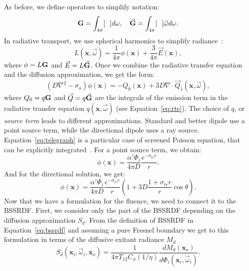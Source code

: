 As before, we define operators to simplify notation:
\begin{equation*}
\operator{G} = \int_{4\pi} [\ \ ] d\omega, \ \ \ \vec{\operator{G}} = \int_{4\pi} [\ \ ] \vec{\omega} d\omega.
\end{equation*}
In radiative transport, we use spherical harmonics to simplify radiance~\cite{Eason1978}:
\begin{equation*}
L(\mathbf{x}, \vec{\omega}) = \frac{1}{4\pi}\phi(\mathbf{x}) + \frac{3}{4\pi} \vec{E}(\mathbf{x}),
\end{equation*}
where $\phi = L \mathbf{G}$ and $\vec{E} = L \vec{\mathbf{G}}$. Once we combine the radiative transfer equation and the diffusion approximation, we get the form:
\begin{equation}
\label{eq:telegraph}
(D \nabla^2 - \sigma_a)\phi(\mathbf{x}) = -Q_0(\mathbf{x}) + 3D \nabla \cdot \vec{Q}_1(\mathbf{x}, \vec{\omega}),
\end{equation}
where $Q_0 = q \mathbf{G}$ and $\vec{Q} = q \vec{\mathbf{G}}$ are the integrals of the emission term in the radiative transfer equation $q(\mathbf{x}, \vec{\omega})$ (see Equation~\ref{eq:rte}). The choice of $q$, or \emph{source term} leads to different approximations. Standard and better dipole use a point source term, while the directional dipole uses a ray source. Equation~\ref{eq:telegraph} is a particular case of screened Poisson equation, that can be explicitly integrated~\cite{Fetter2003}. For a point source term, we obtain:
\begin{equation}
\label{eq:fluencepoint}
\phi(\mathbf{x}) = \frac{\alpha' \Phi_i}{4 \pi D} \frac{e^{-\sigma_{tr} r}}{r}.
\end{equation}
And for the directional solution, we get:
\begin{equation}
\label{eq:fluenceray}
\phi(\mathbf{x}) = \frac{\alpha' \Phi_i}{4 \pi D} \frac{e^{-\sigma_{tr} r}}{r} \left(1 + 3D \frac{1 + \sigma_{tr} r}{r} \cos\theta \right).
\end{equation}
Now that we have a formulation for the fluence, we need to connect it to the BSSRDF. First, we consider only the part of the BSSRDF depending on the diffusion approximation $S_d$. From the definition of BSSRDF in Equation~\ref{eq:bssrdf} and assuming a pure Fresnel boundary we get to this formulation in terms of the diffusive exitant radiance $M_d$
\begin{equation*}
S_d(\mathbf{x}_i, \vec{\omega}_i, \mathbf{x}_o)  =  \frac{1}{4\pi T_{12}C_\phi(1/\eta)} \frac{d M_d(\mathbf{x}_o)}{d \Phi_i(\mathbf{x}_i, \vec{\omega}_i)} .
\end{equation*} 
